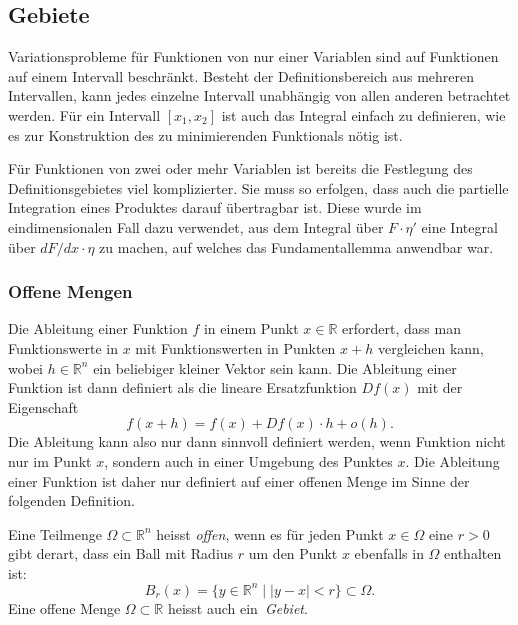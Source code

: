 %
%
%

%
%
\subsection{Gebiete}
Variationsprobleme für Funktionen von nur einer Variablen sind auf 
Funktionen auf einem Intervall beschränkt.
Besteht der Definitionsbereich aus mehreren Intervallen, kann jedes
einzelne Intervall unabhängig von allen anderen betrachtet werden.
Für ein Intervall $[x_1,x_2]$ ist auch das Integral einfach zu definieren,
wie es zur Konstruktion des zu minimierenden Funktionals nötig ist.

Für Funktionen von zwei oder mehr Variablen ist bereits die
Festlegung des Definitionsgebietes viel komplizierter.
Sie muss so erfolgen, dass auch die partielle Integration eines
Produktes darauf übertragbar ist.
Diese wurde im eindimensionalen Fall dazu verwendet, aus dem Integral
über $F\cdot\eta'$ eine Integral über $dF/dx\cdot \eta$ zu
machen, auf welches das Fundamentallemma anwendbar war.

%
%
\subsubsection{Offene Mengen}
Die Ableitung einer Funktion $f$ in einem Punkt $x\in\mathbb{R}$ erfordert,
dass man Funktionswerte in $x$ mit Funktionswerten in Punkten $x+h$
vergleichen kann, wobei $h\in\mathbb{R}^n$ ein beliebiger kleiner Vektor
sein kann.
Die Ableitung einer Funktion ist dann definiert als die lineare
Ersatzfunktion $Df(x)$ mit der Eigenschaft
\[
f(x+h) = f(x) + Df(x)\cdot h + o(h).
\]
Die Ableitung kann also nur dann sinnvoll definiert werden, wenn
Funktion nicht nur im Punkt $x$, sondern auch in einer Umgebung
des Punktes $x$.
Die Ableitung einer Funktion ist daher nur definiert auf einer
offenen Menge im Sinne der folgenden Definition.


\begin{definition}
Eine Teilmenge $\Omega\subset\mathbb{R}^n$ heisst {\em offen}, wenn es für
%
jeden Punkt $x\in\Omega$ eine $r>0$ gibt derart, dass ein
Ball mit Radius $r$ um den Punkt $x$ ebenfalls in $\Omega$ enthalten
ist:
\[
B_r(x)
=
\{y\in\mathbb{R}^n
\mid
|y-x|<r\}
\subset \Omega.
\]
Eine offene Menge $\Omega\subset\mathbb{R}$ heisst auch ein {\em Gebiet}.
%
\end{definition}

